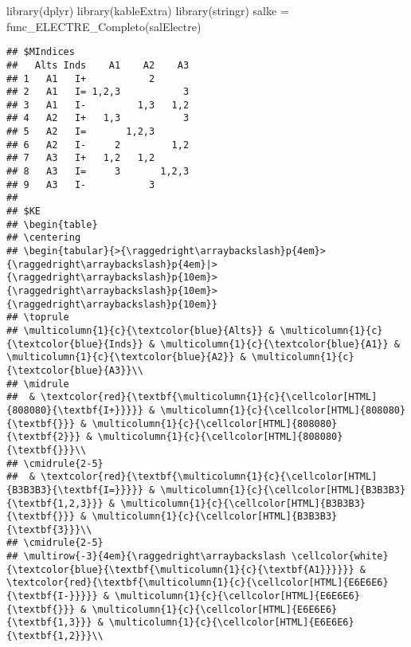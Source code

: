 \documentclass[
]{article}
\newenvironment{Shaded}{\begin{snugshade}}{\end{snugshade}}
\newcommand{\FunctionTok}[1]{\textcolor[rgb]{0.00,0.00,0.00}{#1}}
\newcommand{\NormalTok}[1]{#1}
\newcommand{\OtherTok}[1]{\textcolor[rgb]{0.56,0.35,0.01}{#1}}
\newcommand{\SpecialCharTok}[1]{\textcolor[rgb]{0.00,0.00,0.00}{#1}}
\begin{document}
\begin{Shaded}
\begin{Highlighting}[]
\FunctionTok{library}\NormalTok{(dplyr)}
\FunctionTok{library}\NormalTok{(kableExtra)}
\FunctionTok{library}\NormalTok{(stringr)}
\NormalTok{salke }\OtherTok{=} \FunctionTok{func\_ELECTRE\_Completo}\NormalTok{(salElectre)}
\end{Highlighting}
\end{Shaded}

\begin{Shaded}
\end{Shaded}

\begin{verbatim}
## $MIndices
##   Alts Inds    A1    A2    A3
## 1   A1   I+           2      
## 2   A1   I= 1,2,3           3
## 3   A1   I-         1,3   1,2
## 4   A2   I+   1,3           3
## 5   A2   I=       1,2,3      
## 6   A2   I-     2         1,2
## 7   A3   I+   1,2   1,2      
## 8   A3   I=     3       1,2,3
## 9   A3   I-           3      
## 
## $KE
## \begin{table}
## \centering
## \begin{tabular}{>{\raggedright\arraybackslash}p{4em}>{\raggedright\arraybackslash}p{4em}|>{\raggedright\arraybackslash}p{10em}>{\raggedright\arraybackslash}p{10em}>{\raggedright\arraybackslash}p{10em}}
## \toprule
## \multicolumn{1}{c}{\textcolor{blue}{Alts}} & \multicolumn{1}{c}{\textcolor{blue}{Inds}} & \multicolumn{1}{c}{\textcolor{blue}{A1}} & \multicolumn{1}{c}{\textcolor{blue}{A2}} & \multicolumn{1}{c}{\textcolor{blue}{A3}}\\
## \midrule
##  & \textcolor{red}{\textbf{\multicolumn{1}{c}{\cellcolor[HTML]{808080}{\textbf{I+}}}}} & \multicolumn{1}{c}{\cellcolor[HTML]{808080}{\textbf{}}} & \multicolumn{1}{c}{\cellcolor[HTML]{808080}{\textbf{2}}} & \multicolumn{1}{c}{\cellcolor[HTML]{808080}{\textbf{}}}\\
## \cmidrule{2-5}
##  & \textcolor{red}{\textbf{\multicolumn{1}{c}{\cellcolor[HTML]{B3B3B3}{\textbf{I=}}}}} & \multicolumn{1}{c}{\cellcolor[HTML]{B3B3B3}{\textbf{1,2,3}}} & \multicolumn{1}{c}{\cellcolor[HTML]{B3B3B3}{\textbf{}}} & \multicolumn{1}{c}{\cellcolor[HTML]{B3B3B3}{\textbf{3}}}\\
## \cmidrule{2-5}
## \multirow{-3}{4em}{\raggedright\arraybackslash \cellcolor{white}{\textcolor{blue}{\textbf{\multicolumn{1}{c}{\textbf{A1}}}}}} & \textcolor{red}{\textbf{\multicolumn{1}{c}{\cellcolor[HTML]{E6E6E6}{\textbf{I-}}}}} & \multicolumn{1}{c}{\cellcolor[HTML]{E6E6E6}{\textbf{}}} & \multicolumn{1}{c}{\cellcolor[HTML]{E6E6E6}{\textbf{1,3}}} & \multicolumn{1}{c}{\cellcolor[HTML]{E6E6E6}{\textbf{1,2}}}\\

\end{verbatim}
\end{document}
